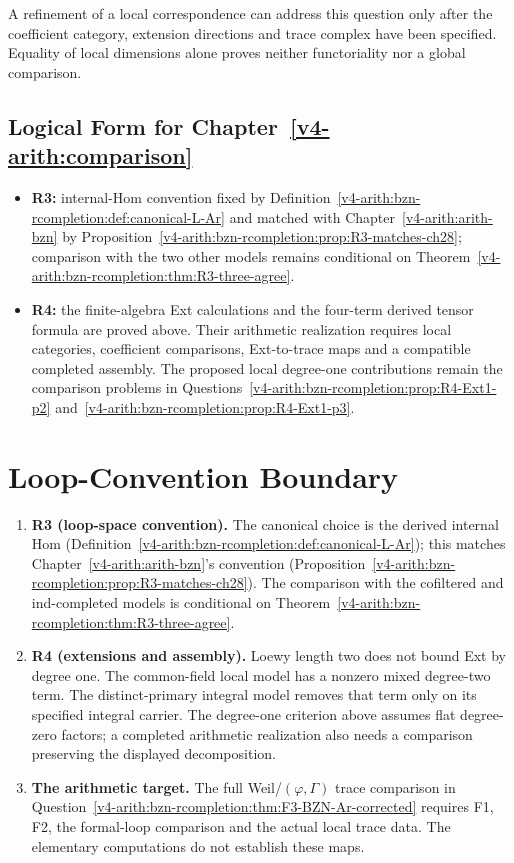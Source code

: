 A refinement of a local correspondence can address this question
only after the coefficient category, extension directions and
trace complex have been specified. Equality of local dimensions
alone proves neither functoriality nor a global comparison.

\subsection{Logical Form for Chapter~\ref{v4-arith:comparison}}

\begin{itemize}
\item \textbf{R3:} internal-Hom convention fixed by
Definition~\ref{v4-arith:bzn-rcompletion:def:canonical-L-Ar} and matched with
Chapter~\ref{v4-arith:arith-bzn} by
Proposition~\ref{v4-arith:bzn-rcompletion:prop:R3-matches-ch28}; comparison with
the two other models remains conditional on
Theorem~\ref{v4-arith:bzn-rcompletion:thm:R3-three-agree}.
\item \textbf{R4:} the finite-algebra Ext calculations and the
four-term derived tensor formula are proved above. Their arithmetic
realization requires local categories, coefficient comparisons,
Ext-to-trace maps and a compatible completed assembly. The proposed
local degree-one contributions remain the comparison problems in
Questions~\ref{v4-arith:bzn-rcompletion:prop:R4-Ext1-p2}
and~\ref{v4-arith:bzn-rcompletion:prop:R4-Ext1-p3}.
\end{itemize}

\section{Loop-Convention Boundary}
\label{v4-arith:bzn-rcompletion:summary}

\begin{enumerate}
\item \textbf{R3 (loop-space convention).}
The canonical choice is the derived internal Hom
(Definition~\ref{v4-arith:bzn-rcompletion:def:canonical-L-Ar}); this
matches Chapter~\ref{v4-arith:arith-bzn}'s convention
(Proposition~\ref{v4-arith:bzn-rcompletion:prop:R3-matches-ch28}). The
comparison with the cofiltered and ind-completed models is conditional
on Theorem~\ref{v4-arith:bzn-rcompletion:thm:R3-three-agree}.
\item \textbf{R4 (extensions and assembly).}
Loewy length two does not bound Ext by degree one.
The common-field local model has a nonzero mixed degree-two term.
The distinct-primary integral model removes that term only on its
specified integral carrier. The degree-one criterion above assumes flat degree-zero factors;
a completed arithmetic realization also needs a comparison preserving
the displayed decomposition.
\item \textbf{The arithmetic target.}
The full Weil/\((\varphi,\Gamma)\) trace comparison in
Question~\ref{v4-arith:bzn-rcompletion:thm:F3-BZN-Ar-corrected}
requires F1, F2, the formal-loop comparison and the actual local
trace data. The elementary computations do not establish these maps.
\end{enumerate}
